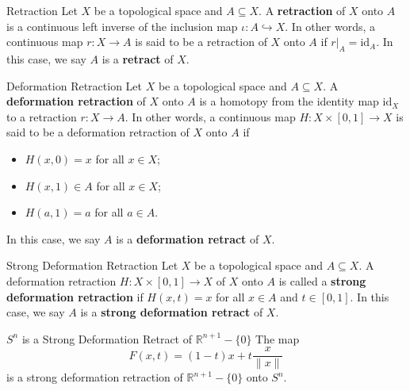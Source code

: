 \documentclass{report}
\begin{document}
\begin{definition}{Retraction}{}
	Let $X$ be a topological space and $A\subseteq X$. A \textbf{retraction} of $X$ onto $A$ is a continuous left inverse of the inclusion map $\iota:A\hookrightarrow X$.  In other words, a continuous map $r:X\to A$ is said to be a retraction of $X$ onto $A$ if $r|_{A}=\mathrm{id}_A$. In this case, we say $A$ is a \textbf{retract} of $X$.
\end{definition}

\begin{definition}{Deformation Retraction}{}
	Let $X$ be a topological space and $A\subseteq X$. A \textbf{deformation retraction} of $X$ onto $A$ is a homotopy from the identity map $\mathrm{id}_X$ to a retraction $r:X\to A$. In other words, a continuous map $H:X\times [0,1]\to X$ is said to be a deformation retraction of $X$ onto $A$ if
	\begin{itemize}
		\item $H(x,0)=x$ for all $x\in X$;
		\item $H(x,1)\in A$ for all $x\in X$;
		\item $H(a,1)=a$ for all $a\in A$.
	\end{itemize}
	In this case, we say $A$ is a \textbf{deformation retract} of $X$.
\end{definition}

\begin{definition}{Strong Deformation Retraction}{}
	Let $X$ be a topological space and $A\subseteq X$. A deformation retraction $H:X\times [0,1]\to X$ of $X$ onto $A$ is called a \textbf{strong deformation retraction} if $H(x,t)=x$ for all $x\in A$ and $t\in [0,1]$. In this case, we say $A$ is a \textbf{strong deformation retract} of $X$.
\end{definition}

\begin{example}{$S^n$ is a Strong Deformation Retract of $\mathbb{R}^{n+1}-\{0\}$}{}
	The map
	\[
		F(x, t)=(1-t) x+t \frac{x}{\|x\|}
	\]
	is a strong deformation retraction of $\mathbb{R}^{n+1}-\{0\}$ onto $S^{n}$.
\end{example}
\end{document}
